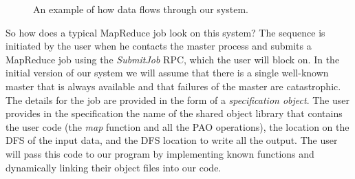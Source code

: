 \documentclass[10pt,letter,final,article,twocolumn]{article} %
\newcommand{\rpc}[1]{\emph{#1}}
\begin{document}
\begin{figure}[htbp]
\begin{center}
\caption{An example of how data flows through our system.}
\label{fig:flow}
\end{center}
\end{figure}


So how does a typical MapReduce job look on this system? The sequence is initiated by the user when he contacts the master process and submits a MapReduce job using the \rpc{SubmitJob} RPC, which the user will block on.  In the initial version of our system we will assume that there is a single well-known master that is always available and that failures of the master are catastrophic. The details for the job are provided in the form of a \emph{specification object}. The user provides in the specification the name of the shared object library that contains the user code (the \emph{map} function and all the PAO operations), the location on the DFS of the input data, and the DFS location to write all the output. The user will pass this code to our program by implementing known functions and dynamically linking their object files into our code.
\end{document}

